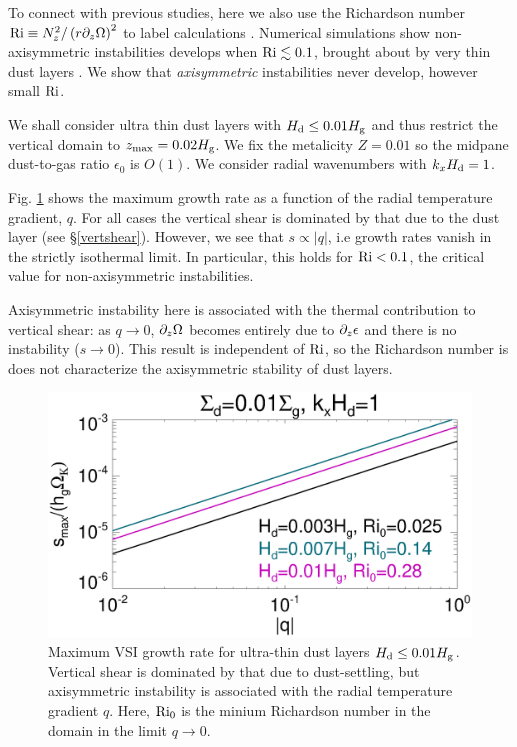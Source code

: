 To connect with previous studies, here  we also use 
the Richardson number $\mathrm{Ri} \equiv N_z^2/\left(r\partial_z\Omega\right)^2$
to label calculations \citep{youdin02}.   
Numerical simulations show    
non-axisymmetric instabilities develops when $\mathrm{Ri}\lesssim0.1$, brought about
by very thin dust layers \citep{chiang08, lee10}. We show that \emph{axisymmetric}
instabilities never develop, however small $\mathrm{Ri}$. 

We shall consider ultra thin dust layers with $H_\mathrm{d}\leq 0.01H_\mathrm{g}$ and thus
restrict the vertical domain to $z_\mathrm{max} = 0.02H_\mathrm{g}$. We fix the 
metalicity $Z=0.01$ so the midpane dust-to-gas ratio $\epsilon_0$ is 
$O(1)$.  We consider radial wavenumbers with $k_xH_\mathrm{d}=1$. 

Fig. \ref{ultra_thin} shows the maximum growth rate  as a function of
the radial temperature gradient, $q$. For all cases the vertical
shear is dominated by that due to the dust layer (see
\S\ref{vertshear}). However, we see that $s\propto
|q|$, i.e growth rates vanish in the strictly isothermal limit.  
In particular, this holds for $\mathrm{Ri} < 0.1$, the critical value 
for non-axisymmetric instabilities. 

Axisymmetric instability here is associated with the thermal
contribution to vertical shear: as $q\to0$,  $\partial_z\Omega$ becomes
entirely due to $\partial_z\epsilon$ and there is no instability ($s\to
0$). This result is independent of $\mathrm{Ri}$, so the Richardson number
is does not characterize the axisymmetric stability of dust
layers. 

\begin{figure}
  \includegraphics[width=\linewidth]{figures/compare_eigenvals_thindust} 
  \caption{Maximum VSI growth rate for ultra-thin dust layers $H_\mathrm{d}
    \leq 0.01H_\mathrm{g}$. Vertical shear is dominated by that due to
    dust-settling, but axisymmetric instability is associated with the
    radial temperature gradient $q$. Here, $\mathrm{Ri}_0$ is the minium
    Richardson number in the domain in the limit $q\to0$. 
    \label{ultra_thin}
    }
\end{figure}




